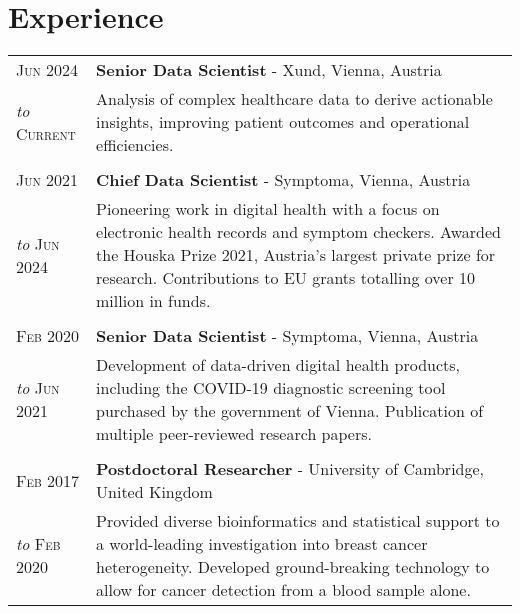 \section{Experience}
\begin{tabular}{>{\raggedleft}p{2.15cm}|p{12cm}}

	\textsc{Jun 2024} &  \textbf{Senior Data Scientist} - Xund, Vienna, Austria \\
	\emph{to} \textsc{Current} & Analysis of complex healthcare data to derive actionable insights, improving patient outcomes and operational efficiencies. \\
	\multicolumn{2}{c}{}\\
	
	\textsc{Jun 2021} &  \textbf{Chief Data Scientist} - Symptoma, Vienna, Austria \\
	\emph{to} \textsc{Jun 2024} & Pioneering work in digital health with a focus on electronic health records and symptom checkers. Awarded the Houska Prize 2021, Austria's largest private prize for research. Contributions to EU grants totalling over 10 million in funds. \\
	
	\multicolumn{2}{c}{}\\

    \textsc{Feb 2020} & \textbf{Senior Data Scientist} - Symptoma, Vienna, Austria \\
	\emph{to} \textsc{Jun 2021} & Development of data-driven digital health products, including the COVID-19 diagnostic screening tool purchased by the government of Vienna. Publication of multiple peer-reviewed research papers. \\
	\multicolumn{2}{c}{}\\
	
	
    \textsc{Feb 2017} &  \textbf{Postdoctoral Researcher} - University of Cambridge, United Kingdom\\
	\emph{to} \textsc{Feb 2020} & Provided diverse bioinformatics and statistical support to a world-leading investigation into breast cancer heterogeneity. Developed ground-breaking technology to allow for cancer detection from a blood sample alone. \\
	
	
	

\end{tabular}
